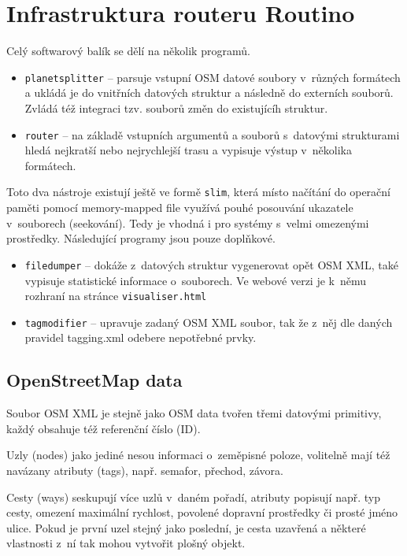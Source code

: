 \documentclass[thesis=B,czech]{FITthesis}[2012/06/26]
\begin{document}
\section{Infrastruktura routeru Routino}

Celý softwarový balík se dělí na několik programů.
\begin{itemize}
	\item{\verb|planetsplitter| -- parsuje vstupní OSM datové soubory v~různých formátech a ukládá je do vnitřních datových struktur a následně do externích souborů. Zvládá též integraci tzv. souborů změn do existujícíh struktur. }
	\item{\verb|router| -- na základě vstupních argumentů a souborů s~datovými strukturami hledá nejkratší nebo nejrychlejší trasu a vypisuje výstup v~několika formátech.}
\end{itemize}	

Toto dva nástroje existují ještě ve formě \verb|slim|, která místo načítání do operační paměti pomocí memory-mapped file využívá pouhé posouvání ukazatele v~souborech (seekování). Tedy je vhodná i pro systémy s~velmi omezenými prostředky. Následující programy jsou pouze doplňkové.

\begin{itemize}
	\item{\verb|filedumper| -- dokáže z~datových struktur vygenerovat opět OSM XML, také vypisuje statistické informace o~souborech. Ve webové verzi je k~němu rozhraní na stránce \verb|visualiser.html|}
	\item{\verb|tagmodifier| -- upravuje zadaný OSM XML soubor, tak že z~něj dle daných pravidel tagging.xml odebere nepotřebné prvky.}
\end{itemize}


\subsection{OpenStreetMap data}
Soubor OSM XML je stejně jako OSM data tvořen třemi datovými primitivy, každý obsahuje též referenční číslo (ID).

 Uzly (nodes) jako jediné nesou informaci o~zeměpisné poloze, volitelně mají též navázany atributy (tags), např. semafor, přechod, závora. 
 
 Cesty (ways) seskupují více uzlů v~daném pořadí, atributy popisují např. typ cesty, omezení maximální rychlost, povolené dopravní prostředky či prosté jméno ulice. Pokud je první uzel stejný jako poslední, je cesta uzavřená a některé vlastnosti z~ní tak mohou vytvořit plošný objekt.
 
\end{document}
